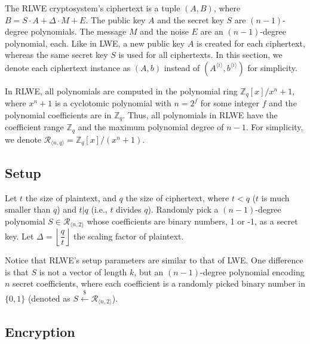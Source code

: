 The RLWE cryptosystem's ciphertext is a tuple $(A, B)$, where $B = S \cdot A + \Delta \cdot M + E$. The public key $A$ and the secret key $S$ are $(n-1)$-degree polynomials. The message $M$ and the noise $E$ are an $(n-1)$-degree polynomial, each. Like in LWE, a new public key $A$ is created for each ciphertext, whereas the same secret key $S$ is used for all ciphertexts. In this section, we denote each ciphertext instance as $(A, b)$ instead of $(A^{\langle i \rangle}, b^{\langle i \rangle})$ for simplicity.

In RLWE, all polynomials are computed in the polynomial ring $\mathbb{Z}_q[x] / x^n + 1$, where $x^n + 1$ is a cyclotomic polynomial with $n = 2^f$ for some integer $f$ and the polynomial coefficients are in $\mathbb{Z}_q$. Thus, all polynomials in RLWE have the coefficient range $\mathbb{Z}_q$ and the maximum polynomial degree of $n -1$. For simplicity, we denote $\mathcal{R}_{\langle n,q \rangle} = \mathbb{Z}_q[x] / (x^n + 1)$.

\subsection{Setup}

Let $t$ the size of plaintext, and $q$ the size of ciphertext, where $t < q$ ($t$ is much smaller than $q$) and $t | q$ (i.e., $t$ divides $q$). Randomly pick a $(n-1)$-degree polynomial $S \in \mathcal{R}_{\langle n, 2 \rangle}$ whose coefficients are binary numbers, 1 or -1, as a secret key. Let $\Delta = \left\lfloor\dfrac{q}{t}\right\rfloor$ the scaling factor of plaintext.

Notice that RLWE's setup parameters are similar to that of LWE. One difference is that $S$ is not a vector of length $k$, but an $(n-1)$-degree polynomial encoding $n$ secret coefficients, where each coefficient is a randomly picked binary number in $\{0, 1\}$ (denoted as $S \xleftarrow{\$} \mathcal{R}_{\langle n, 2 \rangle}$).


\subsection{Encryption}
\label{subsec:rlwe-enc}


